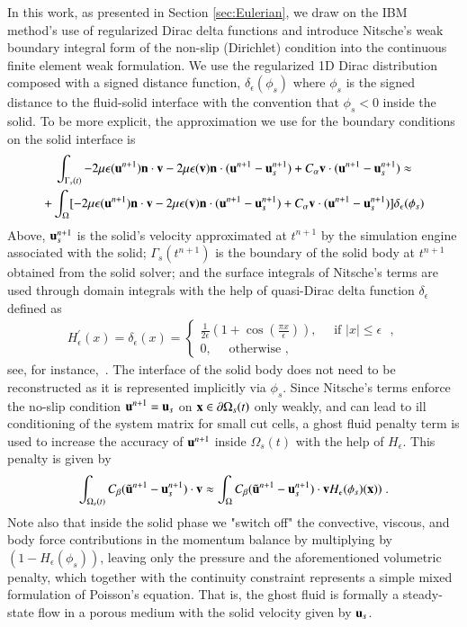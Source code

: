 \documentclass[final,3p,times]{elsarticle}
\begin{document}
In this work, as presented in Section \ref{sec:Eulerian},  we draw on the IBM method's use of regularized Dirac delta functions and introduce Nitsche's weak boundary integral form of the non-slip (Dirichlet) condition into the continuous finite element weak formulation. We use the regularized 1D Dirac distribution composed with a signed distance function, $\delta_\epsilon(\phi_s)$ where $\phi_s$ is the signed distance to the fluid-solid interface with the convention that $\phi_s <0$ inside the solid. To be more explicit, the approximation we use for the boundary conditions on the solid interface is
\begin{multline*}
   \int_{\Gamma_s(t)} -2\mu\mathbf{\epsilon}(\mathbf{u}^{n+1})\mathbf{n}\cdot\mathbf{v} 
   -2\mu\mathbf{\epsilon}(\mathbf{v})\mathbf{n}\cdot(\mathbf{u}^{n+1}-\mathbf{u}_s^{n+1}) 
   +C_\alpha\mathbf{v}\cdot(\mathbf{u}^{n+1}-\mathbf{u}_s^{n+1})\approx \\
   +\int_\Omega [-2\mu\mathbf{\epsilon}(\mathbf{u}^{n+1})\mathbf{n}\cdot\mathbf{v} 
   -2\mu\mathbf{\epsilon}(\mathbf{v})\mathbf{n}\cdot(\mathbf{u}^{n+1}-\mathbf{u}_s^{n+1}) 
   +C_\alpha\mathbf{v}\cdot(\mathbf{u}^{n+1}-\mathbf{u}_s^{n+1})]\delta_\epsilon(\phi_s)
\end{multline*}
Above, $\mathbf{u}_s^{n+1}$ is the solid's velocity approximated at $t^{n+1}$ by the simulation engine associated with the solid; $\Gamma_s(t^{n+1})$ is the boundary 
of the solid body at $t^{n+1}$ obtained from the solid solver; and the surface integrals of Nitsche's terms are used through domain integrals with the help 
of quasi-Dirac delta function $\delta_\epsilon$ defined as
\begin{align*}
H^{'}_{\epsilon}(x) = \delta_{\epsilon}(x)=\begin{cases}
\frac{1}{2\epsilon}(1+\cos(\frac{\pi x}{\epsilon})), \quad\text{ if $|x|\leq \epsilon$ },\\
0,\quad\text{ otherwise },
\end{cases}
\end{align*}
see, for instance,~\cite{Sussman1994}. The interface of the solid body does not need to be reconstructed as it is represented implicitly via $\phi_s$. Since Nitsche's terms enforce the no-slip condition $\mathbf{u}^{n+1}=\mathbf{u}_s$ on $\mathbf{x}\in\partial\Omega_s(t)$ only weakly, and can lead to ill conditioning of the system matrix for small cut cells, a ghost fluid penalty term is used to increase the accuracy of $\mathbf{u}^{n+1}$ inside $\Omega_s(t)$ with the help of $H_\epsilon$. This penalty is given by
\begin{equation*}
\int_{\Omega_s(t)} C_\beta (\tilde{\mathbf{u}}^{n+1}-\mathbf{u}_s^{n+1})\cdot\mathbf{v}  \approx 
\int_\Omega C_\beta (\tilde{\mathbf{u}}^{n+1}-\mathbf{u}_s^{n+1})\cdot\mathbf{v} H_\epsilon(\phi_s)(\mathbf{x})) \; .
\end{equation*}
Note also that inside the solid phase we "switch off" the convective, viscous, and body force contributions in the momentum balance by multiplying by $(1-H_{\epsilon}(\phi_s))$, leaving only the pressure and the aforementioned volumetric penalty, which together with the continuity constraint represents a simple mixed formulation of Poisson's equation. That is, the ghost fluid is formally a steady-state flow in a porous medium with the solid velocity given by $\mathbf{u}_s$.
\end{document}
